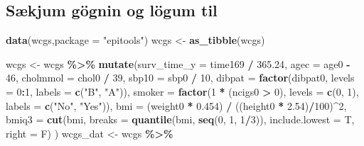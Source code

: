 \documentclass[
]{book}
\newenvironment{Shaded}{\begin{snugshade}}{\end{snugshade}}
\newcommand{\DataTypeTok}[1]{\textcolor[rgb]{0.13,0.29,0.53}{#1}}
\newcommand{\DecValTok}[1]{\textcolor[rgb]{0.00,0.00,0.81}{#1}}
\newcommand{\FloatTok}[1]{\textcolor[rgb]{0.00,0.00,0.81}{#1}}
\newcommand{\KeywordTok}[1]{\textcolor[rgb]{0.13,0.29,0.53}{\textbf{#1}}}
\newcommand{\NormalTok}[1]{#1}
\newcommand{\OperatorTok}[1]{\textcolor[rgb]{0.81,0.36,0.00}{\textbf{#1}}}
\newcommand{\StringTok}[1]{\textcolor[rgb]{0.31,0.60,0.02}{#1}}
\begin{document}
\hypertarget{suxe6kjum-guxf6gnin-og-luxf6gum-til-1}{%
\subsection{Sækjum gögnin og lögum til}\label{suxe6kjum-guxf6gnin-og-luxf6gum-til-1}}

\begin{Shaded}
\begin{Highlighting}[]
\KeywordTok{data}\NormalTok{(wcgs,}\DataTypeTok{package =} \StringTok{"epitools"}\NormalTok{)}
\NormalTok{wcgs <{-}}\StringTok{ }\KeywordTok{as\_tibble}\NormalTok{(wcgs)}

\NormalTok{wcgs <{-}}\StringTok{ }\NormalTok{wcgs }\OperatorTok{\%>\%}\StringTok{ }
\StringTok{  }\KeywordTok{mutate}\NormalTok{(}\DataTypeTok{surv\_time\_y =}\NormalTok{ time169 }\OperatorTok{/}\StringTok{ }\FloatTok{365.24}\NormalTok{,}
         \DataTypeTok{agec =}\NormalTok{ age0 }\OperatorTok{{-}}\StringTok{ }\DecValTok{46}\NormalTok{,}
         \DataTypeTok{cholmmol =}\NormalTok{ chol0 }\OperatorTok{/}\StringTok{ }\DecValTok{39}\NormalTok{,}
         \DataTypeTok{sbp10 =}\NormalTok{ sbp0 }\OperatorTok{/}\StringTok{ }\DecValTok{10}\NormalTok{,}
         \DataTypeTok{dibpat =} \KeywordTok{factor}\NormalTok{(dibpat0, }\DataTypeTok{levels =} \DecValTok{0}\OperatorTok{:}\DecValTok{1}\NormalTok{, }\DataTypeTok{labels =} \KeywordTok{c}\NormalTok{(}\StringTok{"B"}\NormalTok{, }\StringTok{"A"}\NormalTok{)),}
         \DataTypeTok{smoker =} \KeywordTok{factor}\NormalTok{(}\DecValTok{1} \OperatorTok{*}\StringTok{ }\NormalTok{(ncigs0 }\OperatorTok{>}\StringTok{ }\DecValTok{0}\NormalTok{), }\DataTypeTok{levels =} \KeywordTok{c}\NormalTok{(}\DecValTok{0}\NormalTok{, }\DecValTok{1}\NormalTok{), }\DataTypeTok{labels =} \KeywordTok{c}\NormalTok{(}\StringTok{"No"}\NormalTok{, }\StringTok{"Yes"}\NormalTok{)),}
         \DataTypeTok{bmi =}\NormalTok{ (weight0 }\OperatorTok{*}\StringTok{ }\FloatTok{0.454}\NormalTok{) }\OperatorTok{/}\StringTok{ }\NormalTok{((height0 }\OperatorTok{*}\StringTok{ }\FloatTok{2.54}\NormalTok{)}\OperatorTok{/}\DecValTok{100}\NormalTok{)}\OperatorTok{\^{}}\DecValTok{2}\NormalTok{,}
         \DataTypeTok{bmiq3 =} \KeywordTok{cut}\NormalTok{(bmi, }\DataTypeTok{breaks =} \KeywordTok{quantile}\NormalTok{(bmi, }\KeywordTok{seq}\NormalTok{(}\DecValTok{0}\NormalTok{, }\DecValTok{1}\NormalTok{, }\DecValTok{1}\OperatorTok{/}\DecValTok{3}\NormalTok{)),}
                       \DataTypeTok{include.lowest =}\NormalTok{ T, }\DataTypeTok{right =}\NormalTok{ F)}
\NormalTok{         )}
\NormalTok{wcgs\_dat <{-}}\StringTok{ }\NormalTok{wcgs }\OperatorTok{\%>\%}\StringTok{ }

\end{Highlighting}
\end{Shaded}
\end{document}

